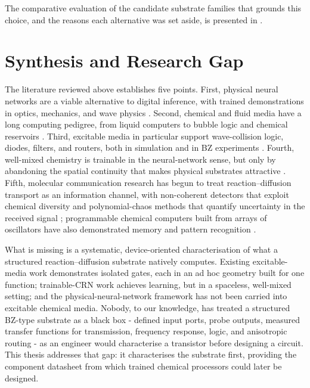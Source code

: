 The comparative evaluation of the candidate substrate families that grounds this choice, and the reasons each alternative was set aside, is presented in .

\section{Synthesis and Research Gap}
\label{sec:lit_synthesis}

The literature reviewed above establishes five points. First, physical neural networks are a viable alternative to digital inference, with trained demonstrations in optics, mechanics, and wave physics \cite{lin2018alloptical, stern2021physical, wright2022deep, hughes2019wave}. Second, chemical and fluid media have a long computing pedigree, from liquid computers to bubble logic and chemical reservoirs \cite{adamatzky2019liquid, prakash2007bubble, baltussen2024chemical}. Third, excitable media in particular support wave-collision logic, diodes, filters, and routers, both in simulation and in BZ experiments \cite{toth1995logic, steinbock1996chemical, adamatzky2002xor, agladze1996chemical, gorecka2003tshaped}. Fourth, well-mixed chemistry is trainable in the neural-network sense, but only by abandoning the spatial continuity that makes physical substrates attractive \cite{dack2024rncrn, cherry2018scaling}. Fifth, molecular communication research has begun to treat reaction--diffusion transport as an information channel, with non-coherent detectors that exploit chemical diversity \cite{lin2023diversity} and polynomial-chaos methods that quantify uncertainty in the received signal \cite{abbaszadeh2019uncertainty}; programmable chemical computers built from arrays of oscillators have also demonstrated memory and pattern recognition \cite{parrilla2020programmable}.

What is missing is a systematic, device-oriented characterisation of what a structured reaction--diffusion substrate natively computes. Existing excitable-media work demonstrates isolated gates, each in an ad hoc geometry built for one function; trainable-CRN work achieves learning, but in a spaceless, well-mixed setting; and the physical-neural-network framework has not been carried into excitable chemical media. Nobody, to our knowledge, has treated a structured BZ-type substrate as a black box - defined input ports, probe outputs, measured transfer functions for transmission, frequency response, logic, and anisotropic routing - as an engineer would characterise a transistor before designing a circuit. This thesis addresses that gap: it characterises the substrate first, providing the component datasheet from which trained chemical processors could later be designed.

